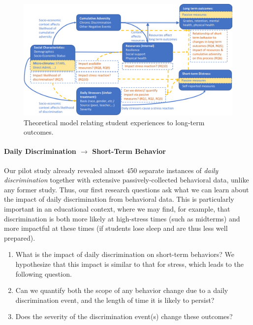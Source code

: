 \begin{figure}
    \centering
    \includegraphics[width=14cm]{img/discrimination-model.png}
    \caption{Theoretical model relating student experiences to long-term outcomes.}
    \label{fig:model}
\end{figure}


\paragraph{Daily Discrimination $\rightarrow$ Short-Term Behavior} Our pilot study already revealed almost 450 separate instances of  \textit{daily discrimination} together with extensive passively-collected behavioral data, unlike any former study. Thus, our first research questions ask what we can learn about the impact of daily discrimination from behavioral data. This is particularly important in an educational context, where we may find, for example, that discrimination is both more likely at high-stress times (such as midterms) and more impactful at these times (if students lose sleep and are thus less well prepared). 
\begin{enumerate}[start=1,label={\bfseries RQ\arabic*}, leftmargin=1cm]
    \item \label{itm:rq-behavior} What is the impact of daily discrimination on short-term behaviors?  We hypothesize that this impact is similar to that for stress, which leads to the following question.
    \item \label{itm:rq-behavior-size} Can we quantify both the scope of any behavior change due to a daily discrimination event, and the length of time it is likely to persist? 
    \item \label{itm:rq-severity-impact} Does the severity of the discrimination event(s) change these outcomes?
\end{enumerate}

